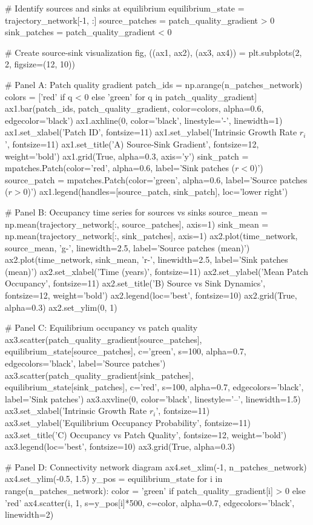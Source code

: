 \documentclass[11pt,a4paper]{article}
\begin{document}
\begin{pycode}
# Identify sources and sinks at equilibrium
equilibrium_state = trajectory_network[-1, :]
source_patches = patch_quality_gradient > 0
sink_patches = patch_quality_gradient < 0

# Create source-sink visualization
fig, ((ax1, ax2), (ax3, ax4)) = plt.subplots(2, 2, figsize=(12, 10))

# Panel A: Patch quality gradient
patch_ids = np.arange(n_patches_network)
colors = ['red' if q < 0 else 'green' for q in patch_quality_gradient]
ax1.bar(patch_ids, patch_quality_gradient, color=colors, alpha=0.6, edgecolor='black')
ax1.axhline(0, color='black', linestyle='-', linewidth=1)
ax1.set_xlabel('Patch ID', fontsize=11)
ax1.set_ylabel('Intrinsic Growth Rate $r_i$', fontsize=11)
ax1.set_title('A) Source-Sink Gradient', fontsize=12, weight='bold')
ax1.grid(True, alpha=0.3, axis='y')
sink_patch = mpatches.Patch(color='red', alpha=0.6, label='Sink patches ($r < 0$)')
source_patch = mpatches.Patch(color='green', alpha=0.6, label='Source patches ($r > 0$)')
ax1.legend(handles=[source_patch, sink_patch], loc='lower right')

# Panel B: Occupancy time series for sources vs sinks
source_mean = np.mean(trajectory_network[:, source_patches], axis=1)
sink_mean = np.mean(trajectory_network[:, sink_patches], axis=1)
ax2.plot(time_network, source_mean, 'g-', linewidth=2.5, label='Source patches (mean)')
ax2.plot(time_network, sink_mean, 'r-', linewidth=2.5, label='Sink patches (mean)')
ax2.set_xlabel('Time (years)', fontsize=11)
ax2.set_ylabel('Mean Patch Occupancy', fontsize=11)
ax2.set_title('B) Source vs Sink Dynamics', fontsize=12, weight='bold')
ax2.legend(loc='best', fontsize=10)
ax2.grid(True, alpha=0.3)
ax2.set_ylim(0, 1)

# Panel C: Equilibrium occupancy vs patch quality
ax3.scatter(patch_quality_gradient[source_patches], equilibrium_state[source_patches],
           c='green', s=100, alpha=0.7, edgecolors='black', label='Source patches')
ax3.scatter(patch_quality_gradient[sink_patches], equilibrium_state[sink_patches],
           c='red', s=100, alpha=0.7, edgecolors='black', label='Sink patches')
ax3.axvline(0, color='black', linestyle='--', linewidth=1.5)
ax3.set_xlabel('Intrinsic Growth Rate $r_i$', fontsize=11)
ax3.set_ylabel('Equilibrium Occupancy Probability', fontsize=11)
ax3.set_title('C) Occupancy vs Patch Quality', fontsize=12, weight='bold')
ax3.legend(loc='best', fontsize=10)
ax3.grid(True, alpha=0.3)

# Panel D: Connectivity network diagram
ax4.set_xlim(-1, n_patches_network)
ax4.set_ylim(-0.5, 1.5)
y_pos = equilibrium_state
for i in range(n_patches_network):
    color = 'green' if patch_quality_gradient[i] > 0 else 'red'
    ax4.scatter(i, 1, s=y_pos[i]*500, c=color, alpha=0.7, edgecolors='black', linewidth=2)


\end{pycode}
\end{document}
